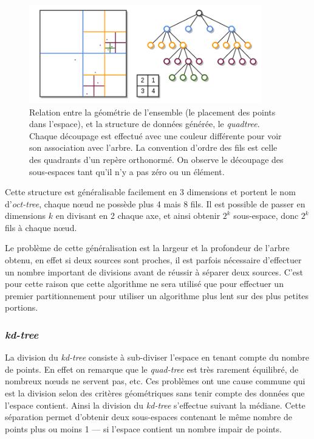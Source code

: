 	\begin{figure}[h]
		\centering
		\includegraphics[width=0.9\textwidth]{img/quadtree.png}
		\caption[Relation entre la géométrie de l'ensemble et le \emph{quadtree} généré]{Relation entre la géométrie de l'ensemble (le placement des points dans l'espace), et la structure de données générée, le \emph{quadtree}. Chaque découpage est effectué avec une couleur différente pour voir son association avec l'arbre. La convention d'ordre des fils est celle des quadrants d'un repère orthonormé. On observe le découpage des sous-espaces tant qu'il n'y a pas zéro ou un élément.}
		\label{fig:quadtree}
	\end{figure}


Cette structure est généralisable facilement en 3 dimensions et portent le nom d'\emph{oct-tree}, chaque n\oe{}ud ne possède plus 4 mais 8 fils. Il est possible de passer en dimensions $k$ en divisant en 2 chaque axe, et ainsi obtenir $2^{k}$ sous-espace, donc $2^{k}$ fils à chaque n\oe{}ud.


Le problème de cette généralisation est la largeur et la profondeur de l'arbre obtenu, en effet si deux sources sont proches, il est parfois nécessaire d'effectuer un nombre important de divisions avant de réussir à séparer deux sources. C'est pour cette raison que cette algorithme ne sera utilisé que pour effectuer un premier partitionnement pour utiliser un algorithme plus lent sur des plus petites portions.


		\subsubsection{\emph{kd-tree}}

La division du \emph{kd-tree} consiste à sub-diviser l'espace en tenant compte du nombre de points. En effet on remarque que le \emph{quad-tree} est très rarement équilibré, de nombreux n\oe{}uds ne servent pas, etc. Ces problèmes ont une cause commune qui est la division selon des critères géométriques sans tenir compte des données que l'espace contient. Ainsi la division du \emph{kd-tree} s'effectue suivant la médiane. Cette séparation permet d'obtenir deux sous-espaces contenant le même nombre de points plus ou moins 1 --- si l'espace contient un nombre impair de points.


